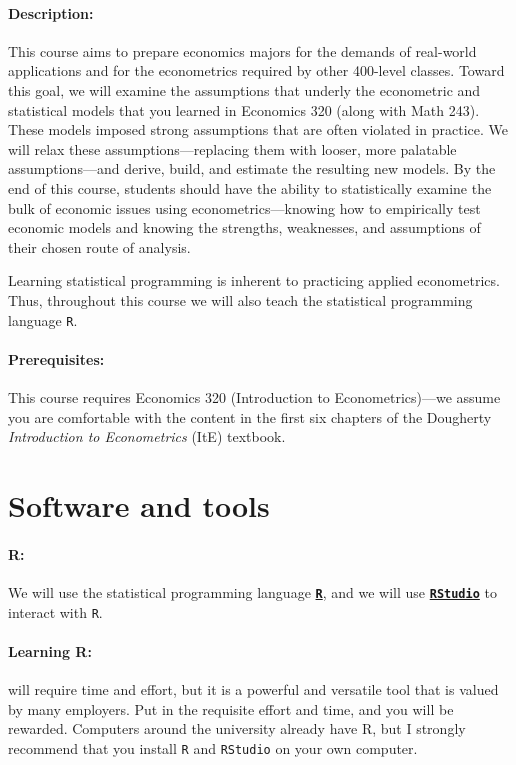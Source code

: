 \documentclass[10pt]{article}
\begin{document}
\paragraph{Description:} This course aims to prepare economics majors for the demands of real-world applications and for the econometrics required by other 400-level classes. Toward this goal, we will examine the assumptions that underly the econometric and statistical models that you learned in Economics 320 (along with Math 243). These models imposed strong assumptions that are often violated in practice. We will relax these assumptions---replacing them with looser, more palatable assumptions---and derive, build, and estimate the resulting new models. By the end of this course, students should have the ability to statistically examine the bulk of economic issues using econometrics---knowing how to empirically test economic models and knowing the strengths, weaknesses, and assumptions of their chosen route of analysis.

Learning statistical programming is inherent to practicing applied econometrics. Thus, throughout this course we will also teach the statistical programming language \texttt{{R}}.

\paragraph{Prerequisites:} This course requires Economics 320 (Introduction to Econometrics)---we assume you are comfortable with the content in the first six chapters of the Dougherty \textit{Introduction to Econometrics} (ItE) textbook.

\section*{Software and tools}

\paragraph{R:} We will use the statistical programming language \href{https://www.r-project.org/}{\textbf{\texttt{R}}}, and we will use \href{https://www.rstudio.com}{\textbf{\texttt{RStudio}}} to interact with \texttt{R}.

\paragraph{Learning R:} will require time and effort, but it is a powerful and versatile tool that is valued by many employers. Put in the requisite effort and time, and you will be rewarded. Computers around the university already have R, but I strongly recommend that you install \texttt{R} and \texttt{RStudio} on your own computer.
\end{document}
